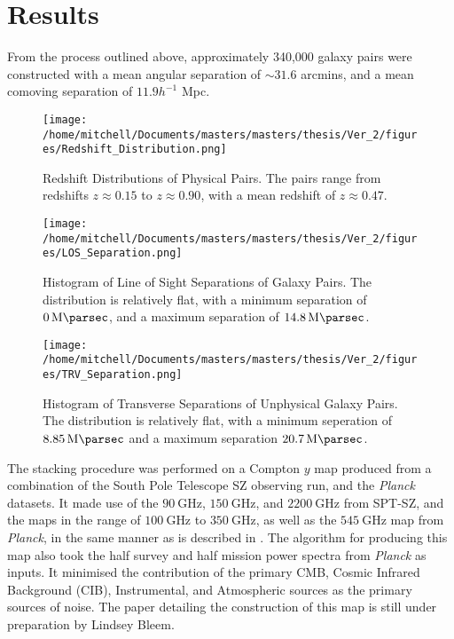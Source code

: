 
\chapter{Results}

From the process outlined above, approximately 340,000 galaxy pairs were constructed with a mean angular separation of $\sim 31.6 $ arcmins, and a mean comoving separation of $11.9 h^{-1}$ Mpc. 

\begin{figure}[h!]
\centering
\texttt{[image: /home/mitchell/Documents/masters/masters/thesis/Ver\_2/figures/Redshift\_Distribution.png]}
\caption{Redshift Distributions of Physical Pairs. The pairs range from redshifts $z\approx0.15$ to $z\approx0.90$, with a mean redshift of $z\approx0.47$.}
\label{fig:physical:redshifts}
\end{figure}


\begin{figure}[h!]
\centering
\texttt{[image: /home/mitchell/Documents/masters/masters/thesis/Ver\_2/figures/LOS\_Separation.png]}
\caption{Histogram of Line of Sight Separations of Galaxy Pairs. The distribution is relatively flat, with a minimum separation of $\SI{0}{\mega\parsec}$, and a maximum separation of $\SI{14.8}{\mega\parsec}$.}
\label{fig:physical:lineofsight}
\end{figure}



\begin{figure}[h!]
\centering
\texttt{[image: /home/mitchell/Documents/masters/masters/thesis/Ver\_2/figures/TRV\_Separation.png]}
\caption{Histogram of Transverse Separations of Unphysical Galaxy Pairs. The distribution is relatively flat, with a minimum seperation of $\SI{8.85}{\mega\parsec}$ and a maximum separation $\SI{20.7}{\mega\parsec}$. }
\label{fig:physical:transverse}
\end{figure}

The stacking procedure was performed on a Compton $y$ map produced from a combination of the South Pole Telescope SZ observing run, and the \emph{Planck} datasets. It made use of the $\SI{90}{\giga\hertz}$, $\SI{150}{\giga\hertz}$, and $\SI{2200}{\giga\hertz}$ from SPT-SZ, and the maps in the range of $\SI{100}{\giga\hertz}$ to $\SI{350}{\giga\hertz}$, as well as the $\SI{545}{\giga\hertz}$ map from \emph{Planck}, in the same manner as is described in \cite{2016ApJS..227...23C}. The algorithm for producing this map also took the half survey and half mission power spectra from \emph{Planck} as inputs. It minimised the contribution of the primary CMB, Cosmic Infrared Background (CIB), Instrumental, and Atmospheric sources as the primary sources of noise. The paper detailing the construction of this map is still under preparation by Lindsey Bleem. 

